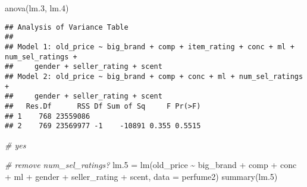 \documentclass[
]{article}
\newenvironment{Shaded}{\begin{snugshade}}{\end{snugshade}}
\newcommand{\AttributeTok}[1]{\textcolor[rgb]{0.77,0.63,0.00}{#1}}
\newcommand{\CommentTok}[1]{\textcolor[rgb]{0.56,0.35,0.01}{\textit{#1}}}
\newcommand{\FloatTok}[1]{\textcolor[rgb]{0.00,0.00,0.81}{#1}}
\newcommand{\FunctionTok}[1]{\textcolor[rgb]{0.00,0.00,0.00}{#1}}
\newcommand{\NormalTok}[1]{#1}
\newcommand{\OtherTok}[1]{\textcolor[rgb]{0.56,0.35,0.01}{#1}}
\newcommand{\SpecialCharTok}[1]{\textcolor[rgb]{0.00,0.00,0.00}{#1}}
\begin{document}
\begin{Shaded}
\begin{Highlighting}[]
\FunctionTok{anova}\NormalTok{(lm}\FloatTok{.3}\NormalTok{, lm}\FloatTok{.4}\NormalTok{)}
\end{Highlighting}
\end{Shaded}

\begin{verbatim}
## Analysis of Variance Table
## 
## Model 1: old_price ~ big_brand + comp + item_rating + conc + ml + num_sel_ratings + 
##     gender + seller_rating + scent
## Model 2: old_price ~ big_brand + comp + conc + ml + num_sel_ratings + 
##     gender + seller_rating + scent
##   Res.Df      RSS Df Sum of Sq     F Pr(>F)
## 1    768 23559086                          
## 2    769 23569977 -1    -10891 0.355 0.5515
\end{verbatim}

\begin{Shaded}
\begin{Highlighting}[]
\CommentTok{\# yes}
\end{Highlighting}
\end{Shaded}

\begin{Shaded}
\begin{Highlighting}[]
\CommentTok{\# remove num\_sel\_ratings?}
\NormalTok{lm}\FloatTok{.5} \OtherTok{=} \FunctionTok{lm}\NormalTok{(old\_price }\SpecialCharTok{\textasciitilde{}}\NormalTok{ big\_brand }\SpecialCharTok{+}\NormalTok{ comp }\SpecialCharTok{+} 
\NormalTok{            conc }\SpecialCharTok{+}\NormalTok{ ml }\SpecialCharTok{+} 
\NormalTok{            gender }\SpecialCharTok{+}\NormalTok{ seller\_rating }\SpecialCharTok{+}\NormalTok{ scent, }\AttributeTok{data =}\NormalTok{ perfume2)}
\FunctionTok{summary}\NormalTok{(lm}\FloatTok{.5}\NormalTok{)}
\end{Highlighting}
\end{Shaded}
\end{document}
